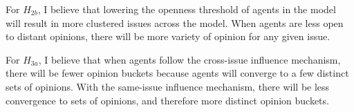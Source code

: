 For $H_{2b}$, I believe that lowering the openness threshold of agents in the
model will result in more clustered issues across the model. When agents are
less open to distant opinions, there will be more variety of opinion for any
given issue. 

For $H_{3a}$, I believe that when agents follow the cross-issue influence mechanism, there will be fewer opinion buckets because agents will converge to a few distinct sets of opinions. With the same-issue influence mechanism, there will be less convergence to sets of opinions, and therefore more distinct opinion buckets. 